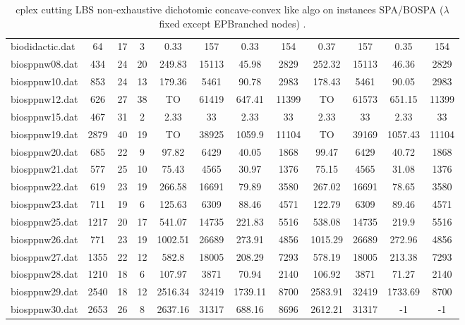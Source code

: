 \begin{sidewaystable}[!ht]
{\begin{tabular}{lccccccccccc}
biodidactic.dat & 64 & 17 & 3 & 0.33 & 157 & 0.33 & 154 & 0.37 & 157 & 0.35 & 154 \\
biosppnw08.dat & 434 & 24 & 20 & 249.83 & 15113 &  \textcolor{blue2}{45.98} & 2829 & 252.32 & 15113 & 46.36 & 2829 \\
biosppnw10.dat & 853 & 24 & 13 & 179.36 & 5461 & 90.78 & 2983 & 178.43 & 5461 &  \textcolor{blue2}{90.05} & 2983 \\
biosppnw12.dat & 626 & 27 & 38 &  TO & 61419 &  \textcolor{blue2}{647.41} & 11399 &  TO & 61573 & 651.15 & 11399 \\
biosppnw15.dat & 467 & 31 & 2 & 2.33 & 33 & 2.33 & 33 & 2.33 & 33 & 2.33 & 33 \\
biosppnw19.dat & 2879 & 40 & 19 &  TO & 38925 & 1059.9 & 11104 &  TO & 39169 & 1057.43 & 11104 \\
biosppnw20.dat & 685 & 22 & 9 & 97.82 & 6429 & 40.05 & 1868 & 99.47 & 6429 & 40.72 & 1868 \\
biosppnw21.dat & 577 & 25 & 10 & 75.43 & 4565 &  \textcolor{blue2}{30.97} & 1376 & 75.15 & 4565 & 31.08 & 1376 \\
biosppnw22.dat & 619 & 23 & 19 & 266.58 & 16691 & 79.89 & 3580 & 267.02 & 16691 & 78.65 & 3580 \\
biosppnw23.dat & 711 & 19 & 6 & 125.63 & 6309 &  \textcolor{blue2}{88.46} & 4571 & 122.79 & 6309 & 89.46 & 4571 \\
biosppnw25.dat & 1217 & 20 & 17 & 541.07 & 14735 & 221.83 & 5516 & 538.08 & 14735 &  \textcolor{blue2}{219.9} & 5516 \\
biosppnw26.dat & 771 & 23 & 19 & 1002.51 & 26689 & 273.91 & 4856 & 1015.29 & 26689 &  \textcolor{blue2}{272.96} & 4856 \\
biosppnw27.dat & 1355 & 22 & 12 & 582.8 & 18005 &  \textcolor{blue2}{208.29} & 7293 & 578.19 & 18005 & 213.38 & 7293 \\
biosppnw28.dat & 1210 & 18 & 6 & 107.97 & 3871 &  \textcolor{blue2}{70.94} & 2140 & 106.92 & 3871 & 71.27 & 2140 \\
biosppnw29.dat & 2540 & 18 & 12 & 2516.34 & 32419 & 1739.11 & 8700 & 2583.91 & 32419 &  \textcolor{blue2}{1733.69} & 8700 \\
biosppnw30.dat & 2653 & 26 & 8 & 2637.16 & 31317 & 688.16 & 8696 & 2612.21 & 31317 & -1 & -1 \\
\bottomrule
\end{tabular}
}%
\caption{cplex cutting LBS non-exhaustive dichotomic concave-convex like algo on instances SPA/BOSPA ($\lambda$ fixed except EPBranched nodes) .}
\end{sidewaystable}
